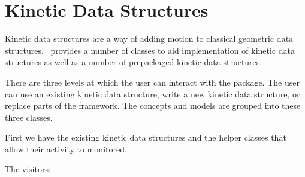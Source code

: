\chapter{Kinetic Data Structures}
\label{ref-chapter-kds}


Kinetic data structures are a way of adding motion to classical
geometric data structures. \cgal\ provides a number of classes to aid
implementation of kinetic data structures as well as a number of
prepackaged kinetic data structures.

There are three levels at which the user can interact with the
package. The user can use an existing kinetic data structure, write a
new kinetic data structure, or replace parts of the framework. The
concepts and models are grouped into these three classes.


First we have the existing kinetic data structures and the helper
classes that allow their activity to monitored.






 
The visitors:








